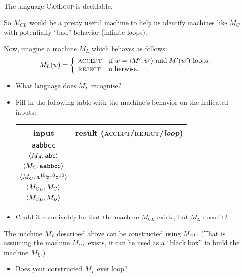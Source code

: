 \documentclass[twoside,letterpaper,openany]{book}
\begin{document}
\begin{stmt}
The language \textsc{CanLoop} is decidable.
\end{stmt}

\begin{discussion}
So $M_{CL}$ would be a pretty useful machine to help us identify machines like $M_C$ with potentially ``bad'' behavior (infinite loops).
\end{discussion}


\begin{exer}
Now, imagine a machine $M_{L}$ which behaves as follows:
\[ M_L(w) = \bigg\{
\begin{array}{ll}
\textsc{accept} &  \textrm{if $w = {\langle{M', w'}\rangle}$ and $M'(w')$ loops.} \\
\textsc{reject} & \textrm{otherwise.}
\end{array}
\]

\begin{itemize}
\item What language does $M_L$ recognize?
\item Fill in the following table with the machine's behavior on the indicated inputs:
\begin{center}
\renewcommand{\arraystretch}{1.25}
\begin{tabular}[c]{c|c}
input & result (\textsc{accept}/\textsc{reject}/\textit{loop}) \\\hline
\texttt{aabbcc} & \\
${\langle{M_{A}, \texttt{abc}}\rangle}$ & \\
${\langle{M_{C}, \texttt{aabbcc}}\rangle}$ & \\
${\langle{M_{C}, \texttt{a}^{10}\texttt{b}^{10}\texttt{c}^{10}}\rangle}$ & \\
${\langle{M_{CL}, M_{C}}\rangle}$ & \\
${\langle{M_{CL}, M_{D}}\rangle}$ & \\
\end{tabular}
\end{center}

\item Could it conceivably be that the machine $M_{CL}$ exists, but $M_L$ doesn't? 
\end{itemize}
\end{exer}

\begin{stmt}
The  machine $M_L$ described above can be constructed using $M_{CL}$. (That is, assuming the machine $M_{CL}$ exists, it can be  used as a ``black box'' to build the machine $M_L$.)
\begin{itemize}
\item Does your constructed $M_L$ ever loop?
\end{itemize}

\end{stmt}
\end{document}
